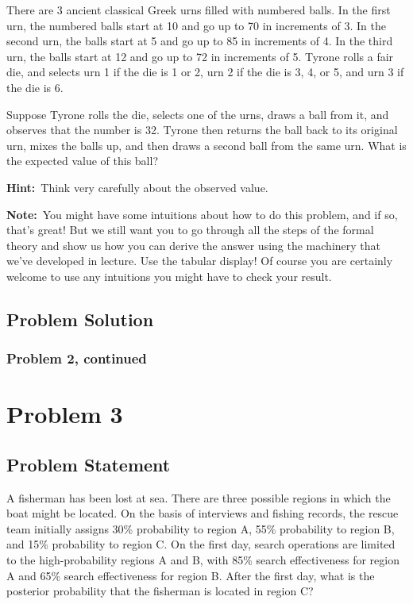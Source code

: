 \documentclass[12pt]{article}
\theoremstyle{definition}
\begin{document}
There are 3 ancient classical Greek urns filled with numbered balls. In the first urn, the numbered balls start at 10 and go up to 70 in increments of 3. In the second urn, the balls start at 5 and go up to 85 in increments of 4. In the third urn, the balls start at 12 and go up to 72 in increments of 5. Tyrone rolls a fair die, and selects urn 1 if the die is 1 or 2, urn 2 if the die is 3, 4, or 5, and urn 3 if the die is 6.

\bigskip
\noindent
Suppose Tyrone rolls the die, selects one of the urns, draws a ball from it, and observes that the number is 32. Tyrone then returns the ball back to its original urn, mixes the balls up, and then draws a second ball from the same urn. What is the expected value of this ball?

\bigskip
\noindent
{\bf Hint:}\ Think very carefully about the observed value.

\bigskip
\noindent
{\bf Note:}\ You might have some intuitions about how to do this problem, and if so, that's great! But we still want you to go through all the steps of the formal theory and show us how you can derive the answer using the machinery that we've developed in lecture. Use the tabular display! Of course you are certainly welcome to use any intuitions you might have to check your result.



\subsection*{Problem Solution}


\newpage
\subsubsection*{Problem 2, continued}

\newpage
\section*{Problem 3}


\subsection*{Problem Statement}

A fisherman has been lost at sea. There are three possible regions in which the boat might be located. On the basis of interviews and fishing records, the rescue team initially assigns 30\% probability to region A, 55\% probability to region B, and 15\% probability to region C. On the first day, search operations are limited to the high-probability regions A and B, with 85\% search effectiveness for region A and 65\% search effectiveness for region B. After the first day, what is the posterior probability that the fisherman is located in region C?
\end{document}
